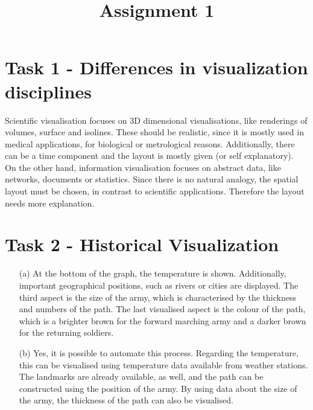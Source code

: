 \documentclass[a4paper]{article}
\date{}
\author{}
\title{Assignment 1}
\begin{document}
	\maketitle 
	\thispagestyle{fancy}
	
	\section*{Task 1 - Differences in visualization disciplines}
	
	Scientific visualisation focuses on 3D dimensional visualisations, like renderings of volumes, surface and isolines. 
	These should be realistic, since it is mostly used in medical applications, for biological or metrological reasons. 
	Additionally, there can be a time component and the layout is mostly given (or self explanatory).\\ \linebreak
	On the other hand, information visualisation focuses on abstract data, like networks, documents or statistics. 
	Since there is no natural analogy, the spatial layout must be chosen, in contrast to scientific applications. 
	Therefore the layout needs more explanation. 
	
	
	\section*{Task 2 - Historical Visualization}
	
	\begin{enumerate}
		\item[(a)] At the bottom of the graph, the temperature is shown. 
		Additionally, important geographical positions, such as rivers or cities are displayed. 
		The third aspect is the size of the army, which is characterised by the thickness and numbers of the path. 
		The last  visualised aspect is the colour of the path, which is a brighter brown for the forward marching army and a darker brown for the returning soldiers. 
		\item[(b)] Yes, it is possible to automate this process. 
		Regarding the temperature, this can be visualised using temperature data available from weather stations.
		The landmarks are already available, as well, and the path can be constructed using the position of the army. 
		By using data about the size of the army, the thickness of the path can also be visualised. 
	\end{enumerate}
	
	\newpage
\end{document}
